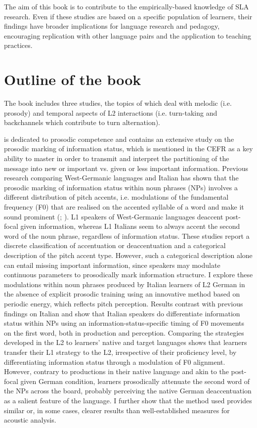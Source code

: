 The aim of this book is to contribute to the empirically-based knowledge of SLA research. Even if these studies are based on a specific population of learners, their findings have broader implications for language research and pedagogy, encouraging replication with other language pairs and the application to teaching practices.

\section{Outline of the book}
\label{sec:1.2}

The book includes three studies, the topics of which deal with melodic (i.e. prosody) and temporal aspects of L2 interactions (i.e. turn-taking and backchannels which contribute to turn alternation). 

 is dedicated to prosodic competence and contains an extensive study on the prosodic marking of information status, which is mentioned in the CEFR as a key ability to master in order to transmit and interpret the partitioning of the message into new or important vs. given or less important information. Previous research comparing West-Germanic languages and Italian has shown that the prosodic marking of information status within noun phrases (NPs) involves a different distribution of pitch accents, i.e. modulations of the fundamental frequency (F0) that are realised on the accented syllable of a word and make it sound prominent (\citealt{AvesaniEtAl2015}; \citealt{SwertsEtAl2002}). L1 speakers of West-Germanic languages deaccent post-focal given information, whereas L1 Italians seem to always accent the second word of the noun phrase, regardless of information status. These studies report a discrete classification of accentuation or deaccentuation and a categorical description of the pitch accent type. However, such a categorical description alone can entail missing important information, since speakers may modulate continuous parameters to prosodically mark information structure. I explore these modulations within noun phrases produced by Italian learners of L2 German in the absence of explicit prosodic training using an innovative method based on periodic energy, which reflects pitch perception. Results contrast with previous findings on Italian and show that Italian speakers do differentiate information status within NPs using an information-status-specific timing of F0 movements on the first word, both in production and perception. Comparing the strategies developed in the L2 to learners’ native and target languages shows that learners transfer their L1 strategy to the L2, irrespective of their proficiency level, by differentiating information status through a modulation of F0 alignment. However, contrary to productions in their native language and akin to the post-focal given German condition, learners prosodically attenuate the second word of the NPs across the board, probably perceiving the native German deaccentuation as a salient feature of the language. I further show that the method used provides similar or, in some cases, clearer results than well-established measures for acoustic analysis.

